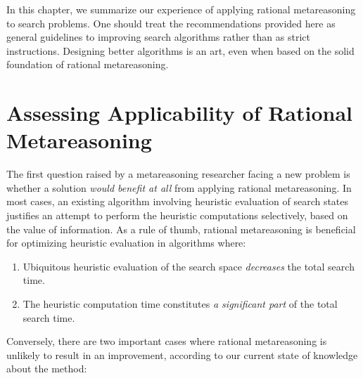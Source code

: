 In this chapter, we summarize our experience of applying rational
metareasoning to search problems. One should treat the recommendations
provided here as general guidelines to improving search algorithms
rather than as strict instructions. Designing better algorithms is an
art, even when based on the solid foundation of rational
metareasoning.

\section{Assessing Applicability of Rational Metareasoning}

The first question raised by a metareasoning researcher facing a new
problem is whether a solution \emph{would benefit at all} from
applying rational metareasoning. In most cases, an existing algorithm
involving heuristic evaluation of search states justifies an attempt
to perform the heuristic computations selectively, based on the value
of information. As a rule of thumb, rational metareasoning is beneficial for
optimizing heuristic evaluation in algorithms where:
\begin{enumerate}
\item Ubiquitous heuristic evaluation of the search space \emph{decreases} the total search
  time.
\item The heuristic computation time constitutes \emph{a significant part} of
  the total search time. 
\end{enumerate}

Conversely, there are two important cases where rational metareasoning
is unlikely to result in an improvement, according to our current state
of knowledge about the method: 

